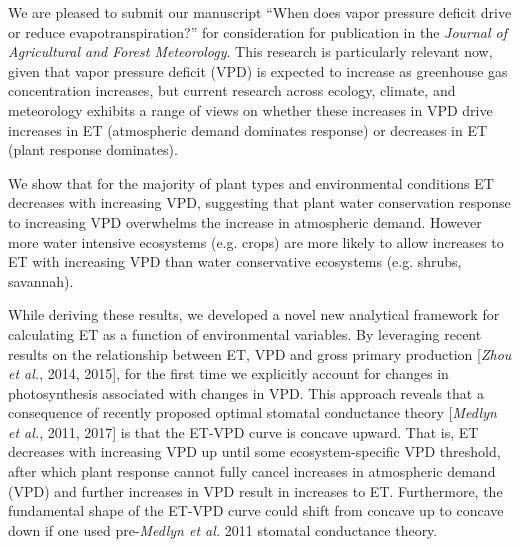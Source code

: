 \documentclass[10pt,stdletter,dateno]{newlfm}
\begin{document}
\begin{newlfm}

  We are pleased to submit our manuscript ``When does vapor pressure deficit drive or reduce evapotranspiration?'' for consideration for publication in the \textit{Journal of Agricultural and Forest Meteorology}. This research is particularly relevant now, given that vapor pressure deficit (VPD) is expected to increase as greenhouse gas concentration increases, but current research across ecology, climate, and meteorology exhibits a range of views on whether these increases in VPD drive increases in ET (atmospheric demand dominates response) or decreases in ET (plant response dominates).

  We show that for the majority of plant types and environmental conditions ET decreases with increasing VPD, suggesting that plant water conservation response to increasing VPD overwhelms the increase in atmospheric demand. However more water intensive ecosystems (e.g. crops) are more likely to allow increases to ET with increasing VPD than water conservative ecosystems (e.g. shrubs, savannah).

  While deriving these results, we developed a novel new analytical framework for calculating ET as a function of environmental variables. By leveraging recent results on the relationship between ET, VPD and gross primary production [\textit{Zhou et al.}, 2014, 2015], for the first time we explicitly account for changes in photosynthesis associated with changes in VPD. This approach reveals that a consequence of recently proposed optimal stomatal conductance theory [\textit{Medlyn et al.}, 2011, 2017] is that the ET-VPD curve is concave upward. That is, ET decreases with increasing VPD up until some ecosystem-specific VPD threshold, after which plant response cannot fully cancel increases in atmospheric demand (VPD) and further increases in VPD result in increases to ET. Furthermore, the fundamental shape of the ET-VPD curve could shift from concave up to concave down if one used pre-\textit{Medlyn et al.} 2011 stomatal conductance theory.


\end{newlfm}
\end{document}
